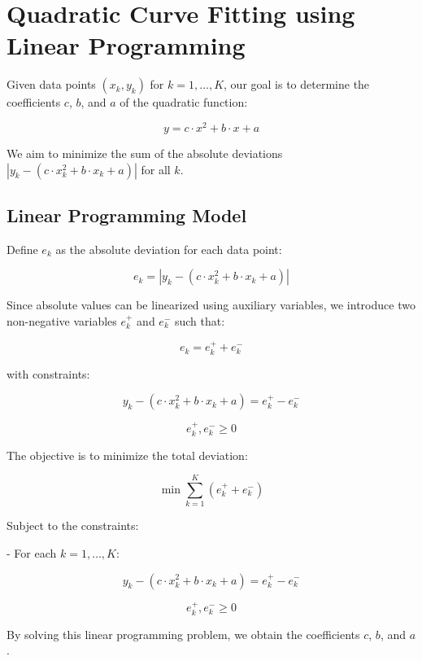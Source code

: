 \documentclass{article}
\begin{document}
\section*{Quadratic Curve Fitting using Linear Programming}

Given data points \((x_k, y_k)\) for \(k = 1, \ldots, K\), our goal is to determine the coefficients \(c\), \(b\), and \(a\) of the quadratic function:

\[
y = c \cdot x^2 + b \cdot x + a
\]

We aim to minimize the sum of the absolute deviations \(|y_k - (c \cdot x_k^2 + b \cdot x_k + a)|\) for all \(k\).

\subsection*{Linear Programming Model}

Define \(e_k\) as the absolute deviation for each data point:

\[
e_k = |y_k - (c \cdot x_k^2 + b \cdot x_k + a)|
\]

Since absolute values can be linearized using auxiliary variables, we introduce two non-negative variables \(e_k^+\) and \(e_k^-\) such that:

\[
e_k = e_k^+ + e_k^-
\]

with constraints:

\[
y_k - (c \cdot x_k^2 + b \cdot x_k + a) = e_k^+ - e_k^-
\]

\[
e_k^+, e_k^- \geq 0
\]

The objective is to minimize the total deviation:

\[
\min \sum_{k=1}^{K} (e_k^+ + e_k^-)
\]

Subject to the constraints:

- For each \(k = 1, \ldots, K\):

\[
y_k - (c \cdot x_k^2 + b \cdot x_k + a) = e_k^+ - e_k^-
\]

\[
e_k^+, e_k^- \geq 0
\]

By solving this linear programming problem, we obtain the coefficients \(c\), \(b\), and \(a\).
\end{document}
